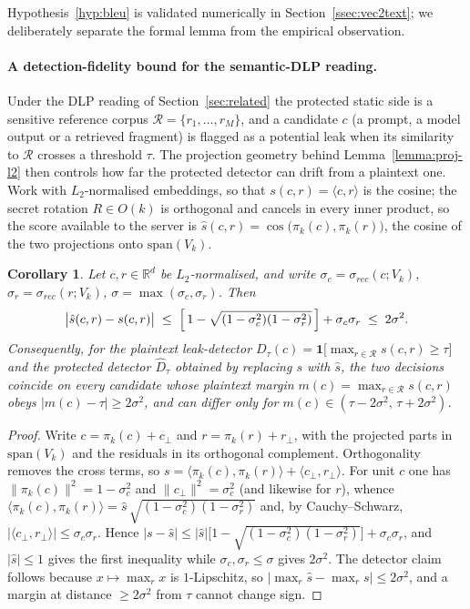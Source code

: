 \documentclass[11pt,a4paper]{article}
\newtheorem{corollary}{Corollary}
\begin{document}
Hypothesis~\ref{hyp:bleu} is validated numerically in
Section~\ref{ssec:vec2text}; we deliberately separate the formal lemma
from the empirical observation.

\paragraph{A detection-fidelity bound for the semantic-DLP reading.}
Under the DLP reading of Section~\ref{sec:related} the protected static
side is a sensitive reference corpus $\mathcal{R}=\{r_1,\dots,r_M\}$, and
a candidate $c$ (a prompt, a model output or a retrieved fragment) is
flagged as a potential leak when its similarity to $\mathcal{R}$ crosses
a threshold $\tau$. The projection geometry behind
Lemma~\ref{lemma:proj-l2} then controls how far the protected detector
can drift from a plaintext one. Work with $L_2$-normalised embeddings, so
that $s(c,r)=\langle c,r\rangle$ is the cosine; the secret rotation
$R\in O(k)$ is orthogonal and cancels in every inner product, so the
score available to the server is
$\hat s(c,r)=\cos\!\bigl(\pi_k(c),\pi_k(r)\bigr)$, the cosine of the two
projections onto $\mathrm{span}(V_k)$.

\begin{corollary}\label{cor:detect}
Let $c,r\in\mathbb{R}^{d}$ be $L_2$-normalised, and write
$\sigma_c=\sigma_{rec}(c;V_k)$, $\sigma_r=\sigma_{rec}(r;V_k)$,
$\sigma=\max(\sigma_c,\sigma_r)$. Then
\[
\bigl|\hat s(c,r)-s(c,r)\bigr|
\;\le\;
\Bigl[\,1-\sqrt{(1-\sigma_c^{2})(1-\sigma_r^{2})}\,\Bigr]+\sigma_c\sigma_r
\;\le\;2\sigma^{2}.
\]
Consequently, for the plaintext leak-detector
$D_\tau(c)=\mathbf{1}\!\bigl[\max_{r\in\mathcal{R}}s(c,r)\ge\tau\bigr]$
and the protected detector $\hat D_\tau$ obtained by replacing $s$ with
$\hat s$, the two decisions coincide on every candidate whose plaintext
margin $m(c)=\max_{r\in\mathcal{R}}s(c,r)$ obeys
$|m(c)-\tau|\ge 2\sigma^{2}$, and can differ only for
$m(c)\in(\tau-2\sigma^{2},\,\tau+2\sigma^{2})$.
\end{corollary}

\begin{proof}
Write $c=\pi_k(c)+c_\perp$ and $r=\pi_k(r)+r_\perp$, with the projected
parts in $\mathrm{span}(V_k)$ and the residuals in its orthogonal
complement. Orthogonality removes the cross terms, so
$s=\langle\pi_k(c),\pi_k(r)\rangle+\langle c_\perp,r_\perp\rangle$. For
unit $c$ one has $\|\pi_k(c)\|^{2}=1-\sigma_c^{2}$ and
$\|c_\perp\|^{2}=\sigma_c^{2}$ (and likewise for $r$), whence
$\langle\pi_k(c),\pi_k(r)\rangle
=\hat s\,\sqrt{(1-\sigma_c^{2})(1-\sigma_r^{2})}$ and, by
Cauchy--Schwarz, $|\langle c_\perp,r_\perp\rangle|\le\sigma_c\sigma_r$.
Hence
$|s-\hat s|\le|\hat s|\bigl[1-\sqrt{(1-\sigma_c^{2})(1-\sigma_r^{2})}\bigr]
+\sigma_c\sigma_r$, and $|\hat s|\le1$ gives the first inequality while
$\sigma_c,\sigma_r\le\sigma$ gives $2\sigma^{2}$. The detector claim
follows because $x\mapsto\max_r x$ is $1$-Lipschitz, so
$\bigl|\max_r\hat s-\max_r s\bigr|\le 2\sigma^{2}$, and a margin at
distance $\ge 2\sigma^{2}$ from $\tau$ cannot change sign.
\end{proof}
\end{document}
